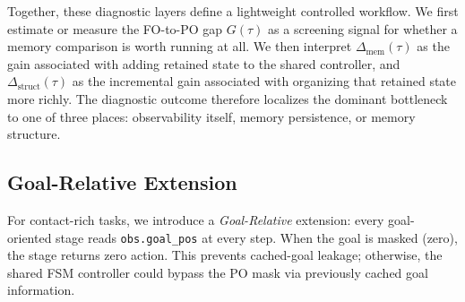 Together, these diagnostic layers define a lightweight controlled workflow. We first estimate or measure the  FO-to-PO gap $G(\tau)$ as a screening signal for whether a memory comparison is worth running at all. We then interpret $\Delta_{\text{mem}}(\tau)$ as the gain associated with adding retained state to the shared controller, and $\Delta_{\text{struct}}(\tau)$ as the incremental gain associated with organizing that retained state more richly. The diagnostic outcome therefore localizes the dominant bottleneck to one of three places: observability itself, memory persistence, or memory structure.

\subsection{Goal-Relative Extension}

For contact-rich tasks, we introduce a \emph{Goal-Relative} extension: every goal-oriented stage reads \texttt{obs.goal\_pos} at every step. When the goal is masked (zero), the stage returns zero action. This prevents cached-goal leakage; otherwise, the shared FSM controller could bypass the PO mask via previously cached goal information.
